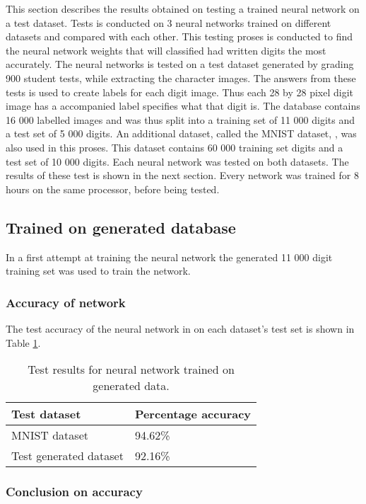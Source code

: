 This section describes the results obtained on testing a trained neural network on a test dataset. Tests is conducted on 3 neural networks trained on different datasets and compared with each other. This testing proses is conducted to find the neural network weights that will classified had written digits the most accurately. The neural networks is tested on a test dataset generated by grading 900 student tests, while extracting the character images. The answers from these tests is used to create labels for each digit image. Thus each 28 by 28 pixel digit image has a accompanied label specifies what that digit is. The database contains 16 000 labelled images and was thus split into a training set of 11 000 digits and a test set of 5 000 digits. An additional dataset, called the MNIST dataset, \citep{mnist}, was also used in this proses. This dataset contains 60 000 training set digits and a test set of 10 000 digits. Each neural network was tested on both datasets. The results of these test is shown in the next section. Every network was trained for 8 hours on the same processor, before being tested.
\subsection{Trained on generated database}
In a first attempt at training the neural network the generated 11 000 digit training set was used to train the network.

\subsubsection{Accuracy of network}

The test accuracy of the neural network in on each dataset's test set is shown in Table \ref{tbl:nnResult1}.

\begin{table}
\caption{Test results for neural network trained on generated data.} \label{tbl:nnResult1}
  \centering
\begin{tabular}{|p{4cm}|p{5cm}|}
\hline
\textbf{Test dataset}&\textbf{Percentage accuracy}\\
\hline
MNIST dataset&94.62\%\\
\hline
Test generated dataset&92.16\%\\
\hline
\end{tabular}
\end{table}

\subsubsection{Conclusion on accuracy}

